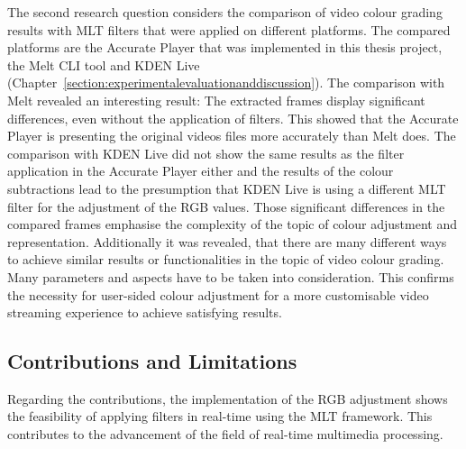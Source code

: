 \documentclass[../MasterThesis.tex]{subfiles}
\begin{document}
The second research question considers the comparison of video colour grading results with MLT filters that were applied on different platforms. The compared platforms are the Accurate Player that was implemented in this thesis project, the Melt CLI tool and KDEN Live (Chapter~\ref{section:experimentalevaluationanddiscussion}).
%
%
The comparison with Melt revealed an interesting result: The extracted frames display significant differences, even without the application of filters. This showed that the Accurate Player is presenting the original videos files more accurately than Melt does.
The comparison with KDEN Live did not show the same results as the filter application in the Accurate Player either and the results of the colour subtractions lead to the presumption that KDEN Live is using a different MLT filter for the adjustment of the RGB values.
%
Those significant differences in the compared frames emphasise the complexity of the topic of colour adjustment and representation. 
%
%
Additionally it was revealed, that there are many different ways to achieve similar results or functionalities in the topic of video colour grading. Many parameters and aspects have to be taken into consideration. This confirms the necessity for user-sided colour adjustment for a more customisable video streaming experience to achieve satisfying results. 





\subsection{Contributions and Limitations} \label{subsection:contributionslimitations}



Regarding the contributions, the implementation of the RGB adjustment shows the feasibility of applying filters in real-time using the MLT framework.
This contributes to the advancement of the field of real-time multimedia processing.
\end{document}

